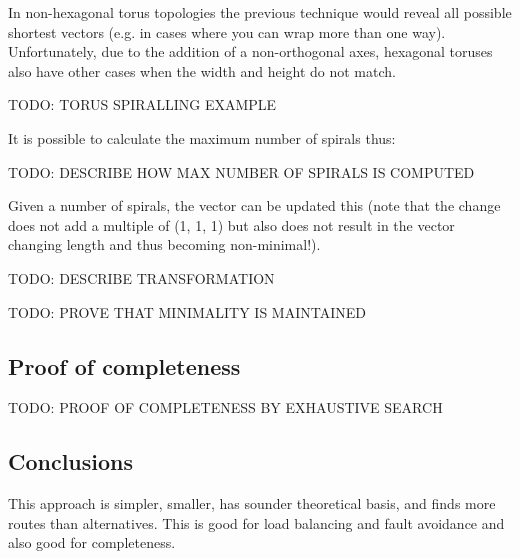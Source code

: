 			In non-hexagonal torus topologies the previous technique would reveal all
			possible shortest vectors (e.g. in cases where you can wrap more than one
			way). Unfortunately, due to the addition of a non-orthogonal axes,
			hexagonal toruses also have other cases when the width and height do not
			match.
			
			TODO: TORUS SPIRALLING EXAMPLE
			
			It is possible to calculate the maximum number of spirals thus:
			
			TODO: DESCRIBE HOW MAX NUMBER OF SPIRALS IS COMPUTED
			
			Given a number of spirals, the vector can be updated this (note that the
			change does not add a multiple of (1, 1, 1) but also does not result in
			the vector changing length and thus becoming non-minimal!).
			
			TODO: DESCRIBE TRANSFORMATION
			
			TODO: PROVE THAT MINIMALITY IS MAINTAINED
		
		\subsection{Proof of completeness}
		
			TODO: PROOF OF COMPLETENESS BY EXHAUSTIVE SEARCH
	
		\subsection{Conclusions}
			
			This approach is simpler, smaller, has sounder theoretical basis, and
			finds more routes than alternatives. This is good for load balancing and
			fault avoidance and also good for completeness.

